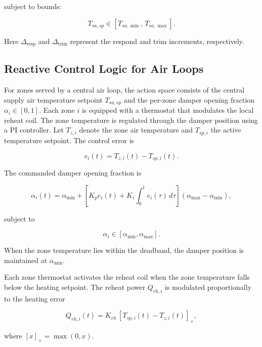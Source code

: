 \documentclass[10pt]{article} %
\begin{document}
\begin{itemize}
    subject to bounds:
    
    \begin{equation}
    T_{sa,sp} \in [T_{sa,\min},\, T_{sa,\max}].
    \end{equation}
    
    Here $\Delta_{\text{resp}}$ and $\Delta_{\text{trim}}$ represent the respond and trim
    increments, respectively.

    
\subsection{Reactive Control Logic for Air Loops}
\label{apdx:reactive_control_logic_air_loop}
For zones served by a central air loop, the action space consists of the central supply air temperature setpoint $T_{sa,sp}$ and the per-zone damper opening fraction $\alpha_i \in [0,1]$. Each zone $i$ is equipped with a thermostat that modulates the local reheat coil. The zone temperature is regulated through the damper position using a PI controller. Let $T_{z,i}$ denote the zone air temperature and $T_{sp,i}$ the active temperature setpoint. The control error is

\begin{equation}
e_i(t) = T_{z,i}(t) - T_{sp,i}(t).
\end{equation}

The commanded damper opening fraction is

\begin{equation}
\alpha_i(t) =
\alpha_{\min}
+
\left[
K_p e_i(t) +
K_i \int_0^t e_i(\tau)\, d\tau
\right]
(\alpha_{\max} - \alpha_{\min}),
\end{equation}

subject to

\begin{equation}
\alpha_i \in [\alpha_{\min}, \alpha_{\max}].
\end{equation}

When the zone temperature lies within the deadband, the damper position is
maintained at $\alpha_{\min}$.

Each zone thermostat activates the reheat coil when the zone temperature falls
below the heating setpoint. The reheat power $Q_{rh,i}$ is modulated
proportionally to the heating error

\begin{equation}
Q_{rh,i}(t) = K_{rh}\,[T_{sp,i}(t) - T_{z,i}(t)]_+ ,
\end{equation}

where $[x]_+ = \max(0,x)$.


\end{itemize}
\end{document}
